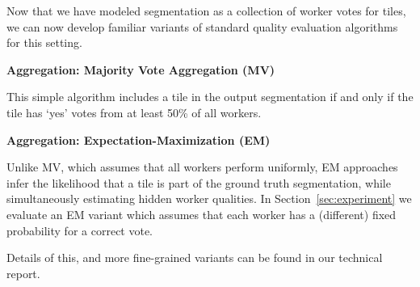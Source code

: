 \documentclass[letterpaper]{article}
\newcommand{\techreport}[1]{}
\newcommand{\agp}[1]{\textcolor{magenta}{Aditya: #1}}
\newcommand{\stitle}[1]{\noindent \textbf{#1}}
\begin{document}
\par Now that we have modeled segmentation as a collection of worker votes for tiles, we can now develop familiar variants of standard quality evaluation algorithms for this setting.

\stitle{Aggregation: Majority Vote Aggregation (MV)} 
\par \noindent This simple algorithm includes a tile in the output segmentation if and only if the tile has `yes' votes from at least 50\% of all workers. %

\stitle{Aggregation: Expectation-Maximization (EM)}
\par \noindent Unlike MV, which assumes that all workers perform uniformly, EM approaches infer the likelihood that a tile is part of the ground truth segmentation, while simultaneously estimating hidden worker qualities.
In Section~\ref{sec:experiment} we evaluate an EM variant which assumes that each worker has a (different) fixed probability for a correct vote.
\techreport{Another model variant accounts for tile areas based on the intuition that workers should be penalized more if they make a mistake on a large tile (e.g. yellow tile in Figure \ref{tile_demo} middle) than on a small tile (e.g. orange tiles near the boundary in Figure \ref{tile_demo} middle). Our advanced %
worker quality model additionally accounts for true- and false-positive rates of the worker's tile votes.}
Details of this, and more fine-grained variants can be found in our technical report.
\end{document}
